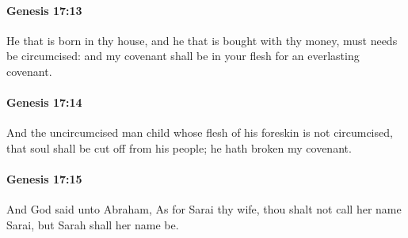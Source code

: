 		\paragraph{Genesis 17:13} %
			\label{GENESIS-17-13}

			He that is born in thy house, and he that is bought with thy money, must needs be circumcised: and my covenant shall be in your flesh for an everlasting covenant.


		\paragraph{Genesis 17:14} %
			\label{GENESIS-17-14}

			And the uncircumcised man child whose flesh of his foreskin is not circumcised, that soul shall be cut off from his people; he hath broken my covenant.


		\paragraph{Genesis 17:15} %
			\label{GENESIS-17-15}

			And God said unto Abraham, As for Sarai thy wife, thou shalt not call her name Sarai, but Sarah shall her name be.


